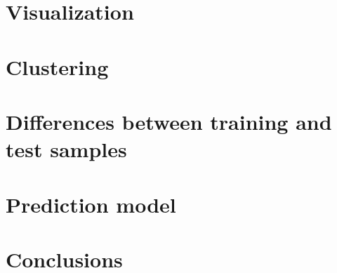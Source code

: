 \section{Visualization}

\section{Clustering}

\section{Differences between training and test samples}

\section{Prediction model}

\section{Conclusions}


